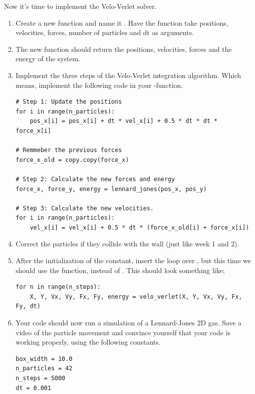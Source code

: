 \documentclass{article}
\begin{document}
Now it's time to implement the Velo-Verlet solver.

\begin{enumerate}[resume]

    \item Create a new function and name it .
        Have the function take positions, velocities, forces, number of particles and dt as arguments.

    \item The new function should return the positions, velocities, forces and the energy of the system.

    \item Implement the three steps of the Velo-Verlet integration algorithm.
        Which means, implement the following code in your -function.

\begin{lstlisting}
# Step 1: Update the positions
for i in range(n_particles):
    pos_x[i] = pos_x[i] + dt * vel_x[i] + 0.5 * dt * dt * force_x[i]

# Remmeber the previous forces
force_x_old = copy.copy(force_x)

# Step 2: Calculate the new forces and energy
force_x, force_y, energy = lennard_jones(pos_x, pos_y)

# Step 3: Calculate the new velocities.
for i in range(n_particles):
    vel_x[i] = vel_x[i] + 0.5 * dt * (force_x_old[i] + force_x[i])

\end{lstlisting}

    \item Correct the particles if they collide with the wall (just like week 1 and 2).

    \item After the initialization of the constant, insert the loop over , but this time we should use the  function, instead of .
        This should look something like;

\begin{lstlisting}
for n in range(n_steps):
    X, Y, Vx, Vy, Fx, Fy, energy = velo_verlet(X, Y, Vx, Vy, Fx, Fy, dt)
\end{lstlisting}

    \item Your code should now run a simulation of a Lennard-Jones 2D gas.
        Save a video of the particle movement and convince yourself that your code is working properly,
        using the following constants.

\begin{lstlisting}
box_width = 10.0
n_particles = 42
n_steps = 5000
dt = 0.001
\end{lstlisting}

\end{enumerate}
\end{document}

